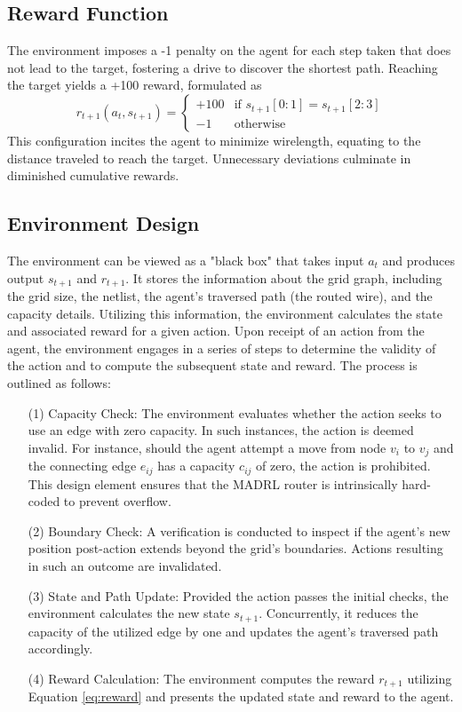 \documentclass[conference]{IEEEtran}
\begin{document}
\subsection{Reward Function}
The environment imposes a -1 penalty on the agent for each step taken that does not lead to the target, fostering a drive to discover the shortest path. Reaching the target yields a +100 reward, formulated as
\begin{equation} \label{eq:reward}
r_{t+1}(a_{t}, s_{t+1}) =
\begin{cases}
+100 & \text{if \(s_{t+1}[0:1] = s_{t+1}[2:3]\)} \\
-1 & \text{otherwise}
\end{cases}
\end{equation}
This configuration incites the agent to minimize wirelength, equating to the distance traveled to reach the target. Unnecessary deviations culminate in diminished cumulative rewards.

\subsection{Environment Design}
The environment can be viewed as a "black box" that takes input $a_{t}$ and produces output $s_{t+1}$ and $r_{t+1}$. It stores the information about the grid graph, including the grid size, the netlist, the agent's traversed path (the routed wire), and the capacity details. Utilizing this information, the environment calculates the state and associated reward for a given action. Upon receipt of an action from the agent, the environment engages in a series of steps to determine the validity of the action and to compute the subsequent state and reward. The process is outlined as follows:
\begin{itemize}
    \item[(1)] Capacity Check: The environment evaluates whether the action seeks to use an edge with zero capacity. In such instances, the action is deemed invalid. For instance, should the agent attempt a move from node $v_i$ to $v_j$ and the connecting edge $e_{ij}$ has a capacity $c_{ij}$ of zero, the action is prohibited. This design element ensures that the MADRL router is intrinsically hard-coded to prevent overflow.
    \item[(2)] Boundary Check: A verification is conducted to inspect if the agent's new position post-action extends beyond the grid's boundaries. Actions resulting in such an outcome are invalidated.
    \item[(3)] State and Path Update: Provided the action passes the initial checks, the environment calculates the new state $s_{t+1}$. Concurrently, it reduces the capacity of the utilized edge by one and updates the agent’s traversed path accordingly.
    \item[(4)] Reward Calculation: The environment computes the reward $r_{t+1}$ utilizing Equation \ref{eq:reward} and presents the updated state and reward to the agent.
\end{itemize}
\end{document}
